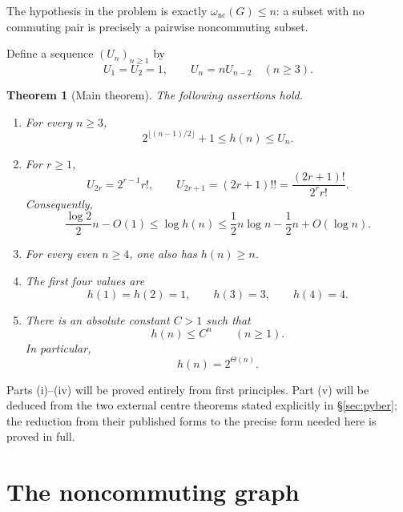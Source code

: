 \documentclass[11pt]{article}
\newtheorem{theorem}{Theorem}[section]
\theoremstyle{definition}
\newcommand{\nc}{\omega_{\mathrm{nc}}}
\begin{document}
The hypothesis in the problem is exactly $\nc(G)\le n$: a subset with no commuting pair is precisely a pairwise noncommuting subset.

Define a sequence $(U_n)_{n\ge1}$ by
\begin{equation}\label{eq:Un-recurrence}
 U_1=U_2=1,
 \qquad
 U_n=nU_{n-2}\quad(n\ge3).
\end{equation}

\begin{theorem}[Main theorem]\label{thm:main}
The following assertions hold.
\begin{enumerate}[label=\textup{\rm(\roman*)}]
\item For every $n\ge3$,
\begin{equation}\label{eq:elementary-main-bounds}
 2^{\lfloor (n-1)/2\rfloor}+1\le h(n)\le U_n.
\end{equation}
\item For $r\ge1$,
\begin{equation}\label{eq:Un-explicit}
 U_{2r}=2^{r-1}r!,
 \qquad
 U_{2r+1}=(2r+1)!!=\frac{(2r+1)!}{2^r r!}.
\end{equation}
Consequently,
\begin{equation}\label{eq:elementary-asymptotic}
 \frac{\log 2}{2}n-O(1)
 \le \log h(n)
 \le \frac12n\log n-\frac12n+O(\log n).
\end{equation}
\item For every even $n\ge4$, one also has $h(n)\ge n$.
\item The first four values are
\begin{equation}\label{eq:small-values}
 h(1)=h(2)=1,
 \qquad
 h(3)=3,
 \qquad
 h(4)=4.
\end{equation}
\item There is an absolute constant $C>1$ such that
\begin{equation}\label{eq:sharp-exponential}
 h(n)\le C^n
 \qquad(n\ge1).
\end{equation}
In particular,
\[
 h(n)=2^{\Theta(n)}.
\]
\end{enumerate}
\end{theorem}

Parts \textup{(i)}--\textup{(iv)} will be proved entirely from first principles.  Part \textup{(v)} will be deduced from the two external centre theorems stated explicitly in \S\ref{sec:pyber}; the reduction from their published forms to the precise form needed here is proved in full.

\section{The noncommuting graph}
\end{document}
